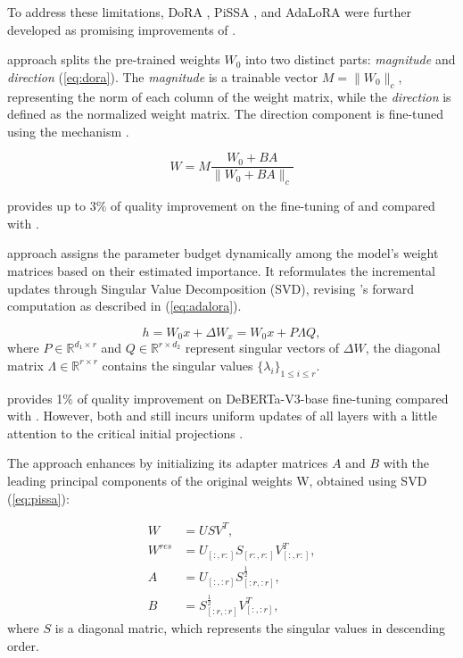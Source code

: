         To address these limitations, DoRA \cite{dora}, PiSSA \cite{pissa}, and AdaLoRA \cite{adalora} were further developed as promising improvements of \lora{}.
        
        \dora{} \cite{dora} approach splits the pre-trained weights $W_0$ into two distinct parts: \textit{magnitude} and \textit{direction} (\ref{eq:dora}). The \textit{magnitude} is a trainable vector $M = \|W_0\|_c$, representing the norm of each column of the weight matrix, while the \textit{direction} is defined as the normalized weight matrix. The direction component is fine-tuned using the \lora{} mechanism \cite{lora}.
        
        \begin{equation}\label{eq:dora}
            W = M \frac{W_0 + BA}{\|W_0 + BA\|_c}
        \end{equation}

        \dora{} provides up to 3\% of quality improvement on the fine-tuning of \llamaTwoSmall{} and \llamaTwoBig{} compared with \lora{}.

        \adalora{} \cite{adalora} approach assigns the parameter budget dynamically among the model’s weight matrices based on their estimated importance. It reformulates the incremental updates through Singular Value Decomposition (SVD), revising \lora{}’s forward computation as described in (\ref{eq:adalora}). 

        \begin{equation}\label{eq:adalora}
            h = W_0x + \Delta W_x = W_0x + P \Lambda Q,
        \end{equation}
        where $P \in \mathbb{R}^{d_1 \times r}$ and $Q \in \mathbb{R}^{r \times d_2}$ represent singular vectors of $\Delta W$, the diagonal matrix $\Lambda \in \mathbb{R}^{r \times r}$ contains the singular values $\{\lambda_i\}_{1 \leq i \leq r}$. 
        
        \adalora{} provides 1\% of quality improvement on DeBERTa-V3-base fine-tuning compared with \lora{}. However, both \dora{} and \adalora{} still incurs uniform updates of all \llm{} layers with a little attention to the critical initial projections \cite{Demidovskij2024}. 

        The \pissa{} approach \cite{pissa} enhances \lora{} by initializing its adapter matrices $A$ and $B$ with the leading principal components of the original weights W, obtained using SVD (\ref{eq:pissa}):

        \begin{equation}\label{eq:pissa}
            \begin{aligned}
                W & = USV^T, \\
                W^{res} & = U_{[:, r:]}S_{[r:, r:]}V^{T}_{[:, r:]}, \\
                A & = U_{[:, :r]}S^{\frac{1}{2}}_{[:r, :r]}, \\
                B & = S^{\frac{1}{2}}_{[:r, :r]}V^T_{[:, :r]},
            \end{aligned}
        \end{equation}
        where \(S\) is a diagonal matric, which represents the singular values in descending order. 
        
